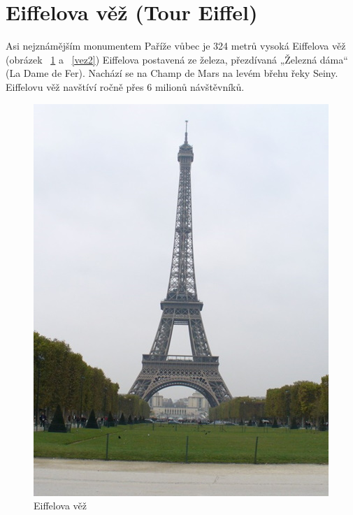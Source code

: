 \section{Eiffelova věž (Tour Eiffel)}
Asi nejznámějším monumentem Paříže vůbec je 324 metrů vysoká Eiffelova věž (obrázek ~\ref{vez1} a ~\ref{vez2}) Eiffelova postavená ze železa, přezdívaná „Železná dáma“ (La Dame de Fer). Nachází se na Champ de Mars na levém břehu řeky Seiny. Eiffelovu věž navštíví ročně přes 6 milionů návštěvníků.
\\
\begin{figure}[h!]
\centering
\includegraphics[scale=0.5]{images/obr3E.jpg}
\caption{Eiffelova věž}
\label{vez1}
\end{figure}
\\
